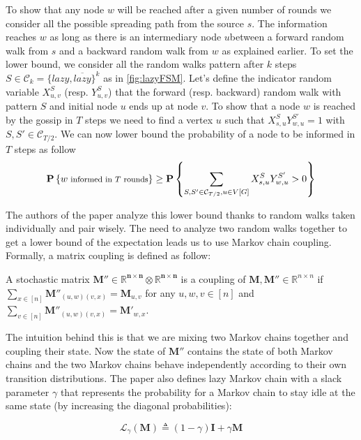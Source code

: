 \documentclass[10pt,journal,a4paper]{IEEEtran}
\begin{document}
To show that any node $w$ will be reached after a given number of rounds we consider all the possible spreading path from the source $s$. The information reaches $w$ as long as there is an intermediary node $u$between a forward random walk from $s$ and a backward random walk from $w$ as explained earlier. To set the lower bound, we consider all the random walks pattern after $k$ steps $S \in \mathcal C_k = \{ lazy, \overline{lazy} \}^k$ as in \cref{fig:lazyFSM}. Let's define the indicator random variable $X_{u,v}^S$ (resp. $Y_{u,v}^S$) that the forward (resp. backward) random walk with pattern $S$ and initial node $u$ ends up at node $v$. To show that a node $w$ is reached by the gossip in $T$ steps we need to find a vertex $u$ such that $X_{s,u}^{S}Y_{w,u}^{S'} = 1$ with $S, S' \in \mathcal C_{T/2}$. We can now lower bound the probability of a node to be informed in $T$ steps as follow
\begin{align*}
  \scriptsize
  \P{w \text{ informed in $T$ rounds}} \geq \P{\sum_{S,S'\in \mathcal C_{T/2}, u\in V[G]} X_{s,u}^S Y_{w,u}^{S'} > 0}
\end{align*}

The authors of the paper analyze this lower bound thanks to random walks taken individually and pair wisely. The need to analyze two random walks together to get a lower bound of the expectation leads us to use Markov chain coupling. Formally, a matrix coupling is defined as follow:

\begin{definition}
  A stochastic matrix $\mathbf{M'' \in \mathbb{R}^{n\times n} \otimes \mathbb{R}^{n\times n}}$ is a coupling of $\mathbf{M,M''} \in \mathbb{R}^{n\times n}$ if $\sum_{x\in[n]} \mathbf{M''}_{(u,w)(v,x)} = \mathbf{M}_{u,v}$ for any $u,w,v \in [n]$ and $\sum_{v\in[n]} \mathbf{M''}_{(u,w)(v,x)} = \mathbf{M'}_{w,x}$.
\end{definition}

The intuition behind this is that we are mixing two Markov chains together and coupling their state. Now the state of $\mathbf{M''}$ contains the state of both Markov chains and the two Markov chains  behave independently according to their own transition distributions. The paper \cite{guosun} also defines lazy Markov chain with a slack parameter $\gamma$ that represents the probability for a Markov chain to stay idle at the same state (by increasing the diagonal probabilities):

\[
  \mathcal L _ \gamma (\mathbf{M}) \triangleq (1-\gamma) \mathbf{I} + \gamma \mathbf{M}
\]
\end{document}
